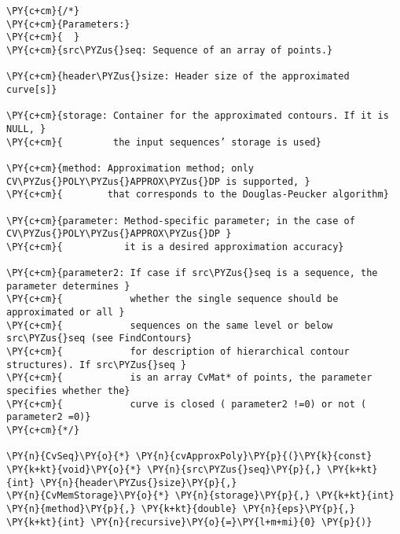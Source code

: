 \begin{Verbatim}[commandchars=\\\{\}]
\PY{c+cm}{/*}
\PY{c+cm}{Parameters:}
\PY{c+cm}{	}
\PY{c+cm}{src\PYZus{}seq: Sequence of an array of points.}

\PY{c+cm}{header\PYZus{}size: Header size of the approximated curve[s]}

\PY{c+cm}{storage: Container for the approximated contours. If it is NULL, }
\PY{c+cm}{         the input sequences’ storage is used}

\PY{c+cm}{method: Approximation method; only CV\PYZus{}POLY\PYZus{}APPROX\PYZus{}DP is supported, }
\PY{c+cm}{        that corresponds to the Douglas-Peucker algorithm}

\PY{c+cm}{parameter: Method-specific parameter; in the case of CV\PYZus{}POLY\PYZus{}APPROX\PYZus{}DP }
\PY{c+cm}{           it is a desired approximation accuracy}

\PY{c+cm}{parameter2: If case if src\PYZus{}seq is a sequence, the parameter determines }
\PY{c+cm}{            whether the single sequence should be approximated or all }
\PY{c+cm}{            sequences on the same level or below src\PYZus{}seq (see FindContours}
\PY{c+cm}{            for description of hierarchical contour structures). If src\PYZus{}seq }
\PY{c+cm}{            is an array CvMat* of points, the parameter specifies whether the}
\PY{c+cm}{            curve is closed ( parameter2 !=0) or not ( parameter2 =0)}
\PY{c+cm}{*/}

\PY{n}{CvSeq}\PY{o}{*} \PY{n}{cvApproxPoly}\PY{p}{(}\PY{k}{const} \PY{k+kt}{void}\PY{o}{*} \PY{n}{src\PYZus{}seq}\PY{p}{,} \PY{k+kt}{int} \PY{n}{header\PYZus{}size}\PY{p}{,}
\PY{n}{CvMemStorage}\PY{o}{*} \PY{n}{storage}\PY{p}{,} \PY{k+kt}{int} \PY{n}{method}\PY{p}{,} \PY{k+kt}{double} \PY{n}{eps}\PY{p}{,} \PY{k+kt}{int} \PY{n}{recursive}\PY{o}{=}\PY{l+m+mi}{0} \PY{p}{)}
\end{Verbatim}

